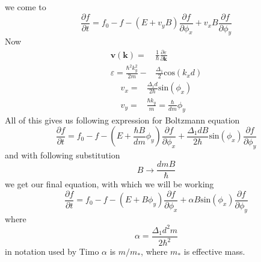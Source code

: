 \documentclass[40pt,letterpaper]{article}
\begin{document}
    we come to 
    \begin{equation}
     \frac{\partial f}{\partial t} = f_0 - f - 
     \left ( E + v_y B \right )\frac{\partial f}{\partial\phi_{x}}+
     v_x B \frac{\partial f}{\partial\phi_{y}}
    \end{equation}
    Now
    \begin{align}
     \mathbf{v}(\mathbf{k})=&\frac{1}{\hbar}\frac{\partial\varepsilon}{\partial\mathbf{k}} \\
     \varepsilon =\frac{\hbar^{2}k_{y}^2}{2m}-&\frac{\Delta_1}{2}\text{cos}(k_{x}d)
    \end{align}
    \begin{align}
     v_x=&\frac{\Delta_{1}d}{2\hbar}\text{sin}(\phi_x) \\
     v_y=&\frac{\hbar k_y}{m}=\frac{\hbar}{dm}\phi_y
    \end{align}
    All of this gives us following expression for Boltzmann equation
    \begin{equation}
     \frac{\partial f}{\partial t} = f_0 - f - 
     \left ( E + \frac{\hbar B}{dm}\phi_y \right ) \frac{\partial f}{\partial\phi_{x}}+
     \frac{\Delta_1 dB}{2\hbar}\text{sin}(\phi_x) \frac{\partial f}{\partial\phi_{y}}
    \end{equation}
    and with following substitution 
    \begin{equation}
     B\to\frac{dmB}{\hbar}
    \end{equation}
    we get our final equation, with which we will be working
    \begin{equation}\label{eq:boltzmann_dimmensionless}
     \boxed{
     \frac{\partial f}{\partial t} = f_0 - f - 
     \left ( E + B\phi_y \right ) \frac{\partial f}{\partial\phi_{x}}+
     \alpha B\text{sin}(\phi_x) \frac{\partial f}{\partial\phi_{y}}}
    \end{equation}
    where
    \begin{equation}
     \alpha=\frac{\Delta_{1}d^{2}m}{2\hbar^2}
    \end{equation}
    in notation used by Timo $\alpha$ is $m/m_*$, where $m_*$ is effective mass.
\end{document}
